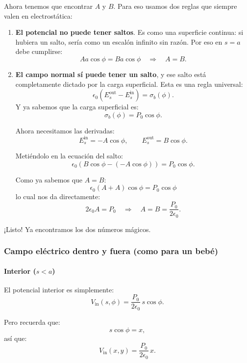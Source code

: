 \documentclass{article}
\begin{document}
Ahora tenemos que encontrar $A$ y $B$. Para eso usamos dos reglas que siempre 
valen en electrostática:

\begin{enumerate}
  \item \textbf{El potencial no puede tener saltos}.  
  Es como una superficie continua: si hubiera un salto, sería como un escalón 
  infinito sin razón. Por eso en $s=a$ debe cumplirse:
  \[
  A a\cos\phi = B a\cos\phi
  \quad\Rightarrow\quad
  A = B.
  \]

  \item \textbf{El campo normal sí puede tener un salto}, y ese salto está
  completamente dictado por la carga superficial.  
  Esta es una regla universal:  
  \[
  \epsilon_{0}(E_{s}^{\text{out}} - E_{s}^{\text{in}}) = \sigma_{b}(\phi).
  \]
  Y ya sabemos que la carga superficial es:
  \[
  \sigma_{b}(\phi) = P_{0}\cos\phi.
  \]

  Ahora necesitamos las derivadas:
  \[
  E_{s}^{\text{in}} = -A\cos\phi,
  \qquad
  E_{s}^{\text{out}} = B\cos\phi.
  \]

  Metiéndolo en la ecuación del salto:
  \[
  \epsilon_{0}(B\cos\phi - (-A\cos\phi)) = P_{0}\cos\phi.
  \]

  Como ya sabemos que $A = B$:
  \[
  \epsilon_{0}(A + A)\cos\phi = P_{0}\cos\phi
  \]
  lo cual nos da directamente:
  \[
  2\epsilon_{0}A = P_{0}
  \quad\Rightarrow\quad
  A = B = \frac{P_{0}}{2\epsilon_{0}}.
  \]
\end{enumerate}

¡Listo! Ya encontramos los dos números mágicos.

\subsubsection*{Campo eléctrico dentro y fuera (como para un bebé)}

\paragraph{Interior ($s<a$)}

El potencial interior es simplemente:
\[
V_{\text{in}}(s,\phi)
= \frac{P_{0}}{2\epsilon_{0}}\,s\cos\phi.
\]

Pero recuerda que:
\[
s\cos\phi = x,
\]
así que:
\[
V_{\text{in}}(x,y)
= \frac{P_{0}}{2\epsilon_{0}}\,x.
\]
\end{document}
